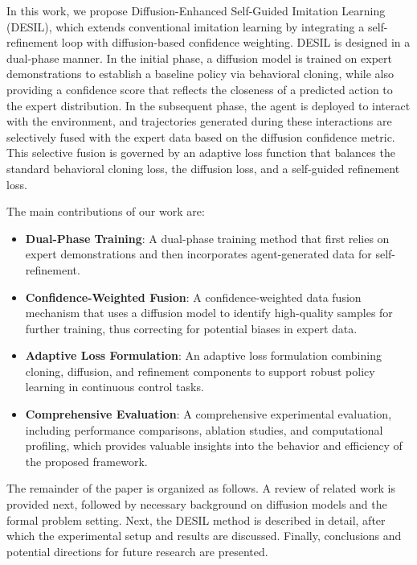 \documentclass{article} %
\begin{document}
In this work, we propose Diffusion-Enhanced Self-Guided Imitation Learning (DESIL), which extends conventional imitation learning by integrating a self-refinement loop with diffusion-based confidence weighting. DESIL is designed in a dual-phase manner. In the initial phase, a diffusion model is trained on expert demonstrations to establish a baseline policy via behavioral cloning, while also providing a confidence score that reflects the closeness of a predicted action to the expert distribution. In the subsequent phase, the agent is deployed to interact with the environment, and trajectories generated during these interactions are selectively fused with the expert data based on the diffusion confidence metric. This selective fusion is governed by an adaptive loss function that balances the standard behavioral cloning loss, the diffusion loss, and a self-guided refinement loss.

The main contributions of our work are:
\begin{itemize}
  \item \textbf{Dual-Phase Training}: A dual-phase training method that first relies on expert demonstrations and then incorporates agent-generated data for self-refinement.
  \item \textbf{Confidence-Weighted Fusion}: A confidence-weighted data fusion mechanism that uses a diffusion model to identify high-quality samples for further training, thus correcting for potential biases in expert data.
  \item \textbf{Adaptive Loss Formulation}: An adaptive loss formulation combining cloning, diffusion, and refinement components to support robust policy learning in continuous control tasks.
  \item \textbf{Comprehensive Evaluation}: A comprehensive experimental evaluation, including performance comparisons, ablation studies, and computational profiling, which provides valuable insights into the behavior and efficiency of the proposed framework.
\end{itemize}

The remainder of the paper is organized as follows. A review of related work is provided next, followed by necessary background on diffusion models and the formal problem setting. Next, the DESIL method is described in detail, after which the experimental setup and results are discussed. Finally, conclusions and potential directions for future research are presented.
\end{document}
